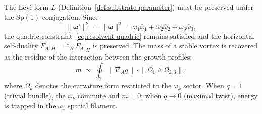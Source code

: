 \begin{remark}
\label{rem:geometric-drag}
The Levi form $L$ (Definition~\ref{def:substrate-parameter}) must be
preserved under the $\mathrm{Sp}(1)$ conjugation.  Since
\[
  \lVert\boldsymbol{\omega}'\rVert^2
  =\lVert\boldsymbol{\omega}\rVert^2
  =\omega_1\bar{\omega}_1+\omega_2\bar{\omega}_2+\omega_3\bar{\omega}_3,
\]
the quadric constraint~\eqref{eq:resolvent-quadric} remains satisfied and
the horizontal self-duality $F_A|_H={*_H}F_A|_H$ is preserved.  The mass of a stable vortex is
recovered as the residue of the interaction between the growth profiles:
\begin{equation}\label{eq:mass-residue}
  m \;\propto\;
  \oint_{\gamma}
  \lVert\nabla_A q\rVert\cdot
  \lVert\Omega_1\wedge\Omega_{2,3}\rVert,
\end{equation}
where $\Omega_k$ denotes the curvature form restricted to the $\omega_k$
sector.  When $q=1$ (trivial bundle), the $\omega_k$ commute and $m=0$;
when $q\to 0$ (maximal twist), energy is trapped in the $\omega_1$ spatial
filament.
\end{remark}


